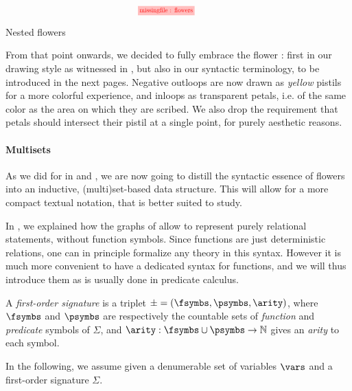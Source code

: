 \begin{marginfigure}
  $$
  \!\!\!\!
  \!\!\!\!
  \!\!\!\!
  \!\!\!\!
  \stkfig{0.65}{flowers}
  $$
  \vspace{-3em}
  \caption{Nested flowers}
\end{marginfigure}

From that point onwards, we decided to fully embrace the flower : first
in our drawing style as witnessed in , but also in our syntactic
terminology, to be introduced in the next pages. Negative outloops are now drawn
as \emph{yellow} pistils for a more colorful experience, and inloops as
transparent petals, i.e. of the same color as the area on which they are
scribed. We also drop the requirement that petals should intersect their pistil
at a single point, for purely aesthetic reasons.

\paragraph{Multisets}

As we did for   in  and , we are
now going to distill the syntactic essence of flowers into an inductive,
(multi)set-based data structure. This will allow for a more compact textual
notation, that is better suited to  study.

In , we explained how the graphs of  allow to represent
purely relational statements, without function symbols. Since functions are just
deterministic relations, one can in principle formalize any  theory
in this syntax. However it is much more convenient to
have a dedicated syntax for functions, and we will thus introduce them as is
usually done in predicate calculus.

\begin{definition}
  A \emph{first-order signature} is a triplet $\mathcal{\Sigma} = (
  \fsymbs, \psymbs, \arity )$, where $\fsymbs$ and $\psymbs$ are
  respectively the countable sets of \emph{function} and \emph{predicate}
  symbols of $\Sigma$, and $\arity : \fsymbs \cup \psymbs \to \nats$ gives an
  \emph{arity} to each symbol.
\end{definition}

In the following, we assume given a denumerable set of variables $\vars$
and a first-order signature $\Sigma$.

